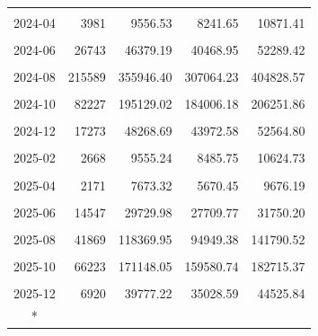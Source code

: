 \begin{longtable}[t]{crrrr}
\cellcolor{gray!10}{2024-03} & \cellcolor{gray!10}{16621} & \cellcolor{gray!10}{18401.62} & \cellcolor{gray!10}{15869.04} & \cellcolor{gray!10}{20934.19}\\
2024-04 & 3981 & 9556.53 & 8241.65 & 10871.41\\
\cellcolor{gray!10}{2024-05} & \cellcolor{gray!10}{10976} & \cellcolor{gray!10}{21654.59} & \cellcolor{gray!10}{19452.71} & \cellcolor{gray!10}{23856.46}\\
2024-06 & 26743 & 46379.19 & 40468.95 & 52289.42\\
\cellcolor{gray!10}{2024-07} & \cellcolor{gray!10}{18231} & \cellcolor{gray!10}{45052.92} & \cellcolor{gray!10}{40647.09} & \cellcolor{gray!10}{49458.74}\\
2024-08 & 215589 & 355946.40 & 307064.23 & 404828.57\\
\cellcolor{gray!10}{2024-09} & \cellcolor{gray!10}{272041} & \cellcolor{gray!10}{412944.74} & \cellcolor{gray!10}{364420.07} & \cellcolor{gray!10}{461469.41}\\
2024-10 & 82227 & 195129.02 & 184006.18 & 206251.86\\
\cellcolor{gray!10}{2024-11} & \cellcolor{gray!10}{46560} & \cellcolor{gray!10}{105128.95} & \cellcolor{gray!10}{96089.92} & \cellcolor{gray!10}{114167.97}\\
2024-12 & 17273 & 48268.69 & 43972.58 & 52564.80\\
\cellcolor{gray!10}{2025-01} & \cellcolor{gray!10}{3423} & \cellcolor{gray!10}{15258.34} & \cellcolor{gray!10}{12689.41} & \cellcolor{gray!10}{17827.28}\\
2025-02 & 2668 & 9555.24 & 8485.75 & 10624.73\\
\cellcolor{gray!10}{2025-03} & \cellcolor{gray!10}{3435} & \cellcolor{gray!10}{9680.33} & \cellcolor{gray!10}{8266.89} & \cellcolor{gray!10}{11093.77}\\
2025-04 & 2171 & 7673.32 & 5670.45 & 9676.19\\
\cellcolor{gray!10}{2025-05} & \cellcolor{gray!10}{8928} & \cellcolor{gray!10}{18444.02} & \cellcolor{gray!10}{16897.85} & \cellcolor{gray!10}{19990.19}\\
2025-06 & 14547 & 29729.98 & 27709.77 & 31750.20\\
\cellcolor{gray!10}{2025-07} & \cellcolor{gray!10}{17170} & \cellcolor{gray!10}{41670.27} & \cellcolor{gray!10}{36730.07} & \cellcolor{gray!10}{46610.47}\\
2025-08 & 41869 & 118369.95 & 94949.38 & 141790.52\\
\cellcolor{gray!10}{2025-09} & \cellcolor{gray!10}{62690} & \cellcolor{gray!10}{199550.66} & \cellcolor{gray!10}{170002.87} & \cellcolor{gray!10}{229098.45}\\
2025-10 & 66223 & 171148.05 & 159580.74 & 182715.37\\
\cellcolor{gray!10}{2025-11} & \cellcolor{gray!10}{20907} & \cellcolor{gray!10}{75632.44} & \cellcolor{gray!10}{67178.65} & \cellcolor{gray!10}{84086.23}\\
2025-12 & 6920 & 39777.22 & 35028.59 & 44525.84\\*
\end{longtable}
